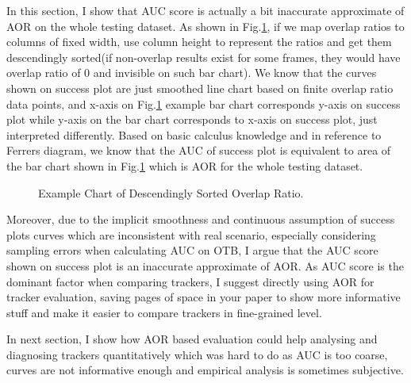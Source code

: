 \documentclass{article}
\begin{document}
In this section, I show that AUC score is actually a bit inaccurate approximate of AOR on the whole testing dataset. As shown in Fig.\ref{fig:auc2aor}, if we map overlap ratios to columns of fixed width, use column height to represent the ratios and get them descendingly sorted(if non-overlap results exist for some frames, they would have overlap ratio of 0 and invisible on such bar chart).  We know that the curves shown on success plot are just smoothed line chart based on finite overlap ratio data points, and x-axis on Fig.\ref{fig:auc2aor} example bar chart corresponds y-axis on success plot while y-axis on the bar chart corresponds to x-axis on success plot, just interpreted differently. Based on basic calculus knowledge and in reference to Ferrers diagram\cite{ferrers}, we know that the AUC of success plot is equivalent to area of the bar chart shown in Fig.\ref{fig:auc2aor} which is AOR for the whole testing dataset.

\begin{figure}
  \centering
  \caption{Example Chart of Descendingly Sorted Overlap Ratio.}
  \label{fig:auc2aor}
\end{figure}

 Moreover, due to the implicit smoothness and continuous assumption of success plots curves which are inconsistent with real scenario, especially considering sampling errors when calculating AUC on OTB\cite{otb}, I argue that the AUC score shown on success plot is an inaccurate approximate of AOR. As AUC score is the dominant factor when comparing trackers, I suggest directly using AOR for tracker evaluation, saving pages of space in your paper to show more informative stuff and make it easier to compare trackers in fine-grained level.
 
 In next section, I show how AOR based evaluation could help analysing and diagnosing trackers quantitatively which was hard to do as AUC is too coarse, curves are not informative enough and empirical analysis is sometimes subjective.
\end{document}
